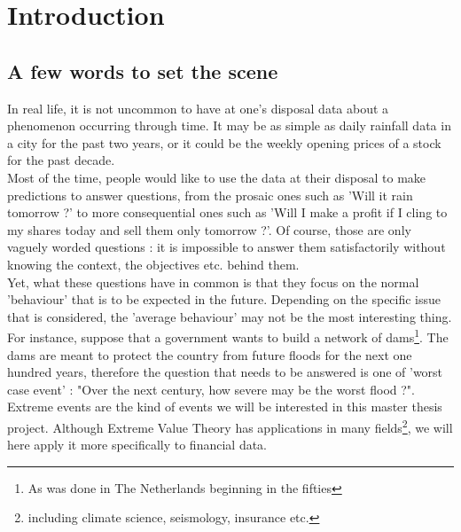 \chapter{Introduction}
 \section{A few words to set the scene}
In real life, it is not uncommon to have at one's disposal data about a phenomenon occurring through time. It may be as simple as daily rainfall data in a city for the past two years, or it could be the weekly opening prices of a stock for the past decade. \\[4 pt]
Most of the time, people would like to use the data at their disposal to make predictions to answer questions, from the prosaic ones such as 'Will it rain tomorrow ?' to more consequential ones such as 'Will I make a profit if I cling to my shares today and sell them only tomorrow ?'. Of course, those are only vaguely worded questions : it is impossible to answer them satisfactorily without knowing the context, the objectives etc. behind them. \\[4 pt]
Yet, what these questions have in common is that they focus on the normal 'behaviour' that is to be expected in the future. Depending on the specific issue that is considered, the 'average behaviour' may not be the most interesting thing. For instance, suppose that a government wants to build a network of dams\footnote{As was done in The Netherlands beginning in the fifties}. The dams are meant to protect the country from future floods for the next one hundred years, therefore the question that needs to be answered is one of 'worst case event' : "Over the next century, how severe may be the worst flood ?". \\[4 pt]
Extreme events are the kind of events we will be interested in this master thesis project. Although Extreme Value Theory has applications in many fields\footnote{including climate science, seismology, insurance etc.}, we will here apply it more specifically to financial data.

